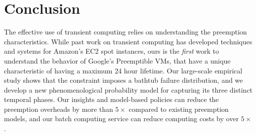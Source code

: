 

\section{Conclusion}
\label{sec:conclusion}
The effective use of transient computing relies on understanding the preemption characteristics.
While past work on transient computing has developed techniques and systems for Amazon's EC2 spot instances, ours is the \emph{first} work to understand the behavior of Google's Preemptible VMs, that have a unique characteristic of having a maximum 24 hour lifetime.
Our large-scale empirical study shows that the constraint imposes a bathtub failure distribution, and we develop a new phenomenological probability model for capturing its three distinct temporal phases. 
Our insights and model-based policies can reduce the preemption overheads by more than $5\times$ compared to existing preemption models, and our batch computing service can reduce computing costs by over $5\times$. 



